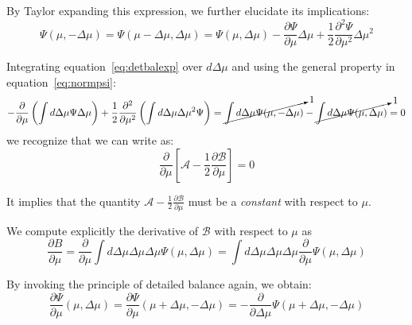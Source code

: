 
By Taylor expanding this expression, we further elucidate its implications:
%
\begin{equation}\label{eq:detbalexp}
\Psi(\mu, -\Delta\mu ) = \Psi(\mu-\Delta\mu , \Delta\mu )=\Psi(\mu,\Delta\mu )-\frac{\partial \Psi}{\partial \mu} \Delta\mu +\frac{1}{2}\frac{\partial^2 \Psi}{\partial\mu^2} \Delta\mu^2
\end{equation}

Integrating equation~\eqref{eq:detbalexp} over \(d\Delta\mu\) and using the general property in equation~\eqref{eq:normpsi}:
%
\begin{equation}
-\frac{\partial}{\partial \mu} \left( \int d\Delta\mu \Psi \Delta\mu \right) + \frac{1}{2}\frac{\partial^2}{\partial\mu^2}\left( \int d\Delta\mu \Delta\mu^2 \Psi \right) = \cancelto{1}{\int d\Delta\mu \Psi(\mu, -\Delta\mu )} - \cancelto{1}{\int d\Delta\mu \Psi(\mu,\Delta\mu)} = 0
\end{equation}
%
we recognize that we can write as:
%
%
\begin{equation}
\frac{\partial}{\partial\mu}\left[ \mathcal A-\frac{1}{2}\frac{\partial \mathcal B}{\partial \mu}\right] = 0
\end{equation}

It implies that the quantity \( \mathcal A - \frac{1}{2} \frac{\partial \mathcal B}{\partial \mu} \) must be a \emph{constant} with respect to \( \mu \).  

We compute explicitly the derivative of \( \mathcal B \) with respect to \( \mu \) as
%
\begin{equation}
\frac{\partial B}{\partial \mu} = \frac{\partial}{\partial\mu} \int d\Delta\mu \Delta\mu\Delta\mu \Psi(\mu,  \Delta\mu)
=   \int d\Delta\mu \Delta\mu\Delta\mu \frac{\partial}{\partial\mu} \Psi(\mu,  \Delta\mu)
\end{equation}

By invoking the principle of detailed balance again, we obtain:
%
{\color{red}\begin{equation}
\frac{\partial\Psi}{\partial\mu}(\mu,\Delta\mu) = 
\frac{\partial\Psi}{\partial\mu}(\mu+\Delta\mu ,-\Delta\mu) = 
-\frac{\partial}{\partial \Delta\mu} \Psi(\mu+\Delta\mu, -\Delta\mu)
\end{equation}}

